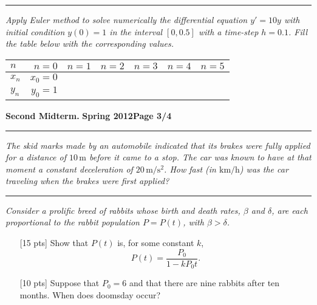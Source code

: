 \documentclass[12pt]{article}
\begin{document}
\vspace{1.5cm}
\hrule
{\problem[15 pts] \em 
Apply Euler method to solve numerically the differential equation $y'=10y$
with initial condition $y(0)=1$ in the interval $[0,0.5]$ with a time-step
$h=0.1$.  Fill the table below with the corresponding values.} 
\begin{center}
\begin{tabular}{|l|r|l|l|l|l|l|}
\hline
$n$ & $n=0$ & $n=1$ & $n=2$ & $n=3$ & $n=4$ & $n=5$ \\
\hline
$x_n$ & $x_0=0$ &&&&& \\
\hline
$y_n$ & $y_0=1$ &&&&& \\
\hline
\end{tabular}
\end{center}
\newpage

\hfill{\large\bf Second Midterm.}\hfill{\large\bf
  Spring 2012}\hfill{\large\bf Page 3/4}\hrule

\bigskip
{\problem[15 pts] \em The skid marks made by an automobile indicated that its
brakes were fully applied for a distance of $10\,\text{m}$ before it came to a
stop.
The car was known to have at that moment a constant deceleration of $20\,
\text{m}/\text{s}^2$.  How fast (in $\text{km}/\text{h}$) was the car traveling
when the brakes were first applied?}
\vspace{4.5cm}
\begin{flushright}
\end{flushright}
\hrule

{\problem[25 pts] \em Consider a prolific breed of rabbits whose birth
and death rates, $\beta$ and $\delta$, are each proportional to the
rabbit population $P=P(t)$, with $\beta > \delta$.}
\begin{itemize}
\item[{[15 pts]}] Show that $P(t)$ is, for some constant $k$, 
\begin{equation*}
P(t) = \frac{P_0}{1-kP_0 t}.
\end{equation*}
\vspace{6cm}
\item[{[10 pts]}] Suppose that $P_0 = 6$ and that there are nine
  rabbits after ten months.  When does doomsday occur?
\vspace{2cm}
\begin{flushright}
\end{flushright}
\end{itemize}
\newpage
\end{document}

